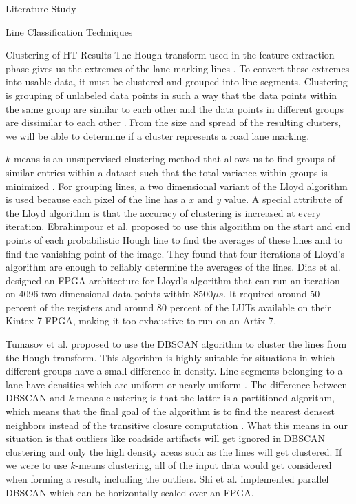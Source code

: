 \documentclass{matthijs}
\begin{document}
\begin{hoofdstuk}{Literature Study}
\begin{paragraaf}{Line Classification Techniques}
\begin{subparagraaf}{Clustering of HT Results}
				The Hough transform used in the feature extraction phase gives us the extremes of the lane marking lines \cite{gupta2016automated}.
				To convert these extremes into usable data, it must be clustered and grouped into line segments.
				Clustering is grouping of unlabeled data points in such a way that the data points within the same group are similar to each other and the data points in different groups are dissimilar to each other \cite{sharma2020kmeans}.
				From the size and spread of the resulting clusters, we will be able to determine if a cluster represents a road lane marking.
				\bigskip

				$k$-means is an unsupervised clustering method that allows us to find groups of similar entries within a dataset such that the total variance within groups is minimized \cite{martin2019implementing}.
				For grouping lines, a two dimensional variant of the Lloyd algorithm is used because each pixel of the line has a $x$ and $y$ value.
				A special attribute of the Lloyd algorithm is that the accuracy of clustering is increased at every iteration.
				Ebrahimpour et al. \cite{ebrahimpour2012vanishing} proposed to use this algorithm on the start and end points of each probabilistic Hough line to find the averages of these lines and to find the vanishing point of the image.
				They found that four iterations of Lloyd's algorithm are enough to reliably determine the averages of the lines.
				Dias et al. \cite{dias2020parallel} designed an FPGA architecture for Lloyd's algorithm that can run an iteration on 4096 two-dimensional data points within $8500 \mu s$.
				It required around 50 percent of the registers and around 80 percent of the LUTs available on their Kintex-7 FPGA, making it too exhaustive to run on an Artix-7.

				\bigskip

				Tumasov et al. \cite{tumasov2021research} proposed to use the DBSCAN algorithm to cluster the lines from the Hough transform.
				This algorithm is highly suitable for situations in which different groups have a small difference in density.
				Line segments belonging to a lane have densities which are uniform or nearly uniform \cite{niu2016robust}.
				The difference between DBSCAN and $k$-means clustering is that the latter is a partitioned algorithm, which means that the final goal of the algorithm is to find the nearest densest neighbors instead of the transitive closure computation \cite{shi2014fpga}.
				What this means in our situation is that outliers like roadside artifacts will get ignored in DBSCAN clustering and only the high density areas such as the lines will get clustered.
				If we were to use $k$-means clustering, all of the input data would get considered when forming a result, including the outliers.
				Shi et al. \cite{shi2014fpga} implemented parallel DBSCAN which can be horizontally scaled over an FPGA.


\end{subparagraaf}
\end{paragraaf}
\end{hoofdstuk}
\end{document}
